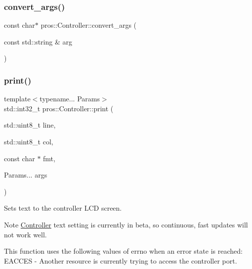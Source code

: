 \mbox{\label{classpros_1_1Controller_a80ab1bf077cfe15fa9b7c4cba27428ef}} 
\subsubsection{\texorpdfstring{convert\+\_\+args()}{convert\_args()}\hspace{0.1cm}{\footnotesize\ttfamily [2/2]}}
{\footnotesize\ttfamily const char$\ast$ pros\+::\+Controller\+::convert\+\_\+args (\begin{DoxyParamCaption}\item[{const std\+::string \&}]{arg }\end{DoxyParamCaption})\hspace{0.3cm}{\ttfamily [inline]}}

\mbox{\label{classpros_1_1Controller_a4a301df3d34578661271f9b400da1176}} 
\subsubsection{\texorpdfstring{print()}{print()}}
{\footnotesize\ttfamily template$<$typename... Params$>$ \\
std\+::int32\+\_\+t pros\+::\+Controller\+::print (\begin{DoxyParamCaption}\item[{std\+::uint8\+\_\+t}]{line,  }\item[{std\+::uint8\+\_\+t}]{col,  }\item[{const char $\ast$}]{fmt,  }\item[{Params...}]{args }\end{DoxyParamCaption})\hspace{0.3cm}{\ttfamily [inline]}}



Sets text to the controller L\+CD screen. 

\begin{DoxyNote}{Note}
\hyperlink{classpros_1_1Controller}{Controller} text setting is currently in beta, so continuous, fast updates will not work well.
\end{DoxyNote}
This function uses the following values of errno when an error state is reached\+: E\+A\+C\+C\+ES -\/ Another resource is currently trying to access the controller port.


